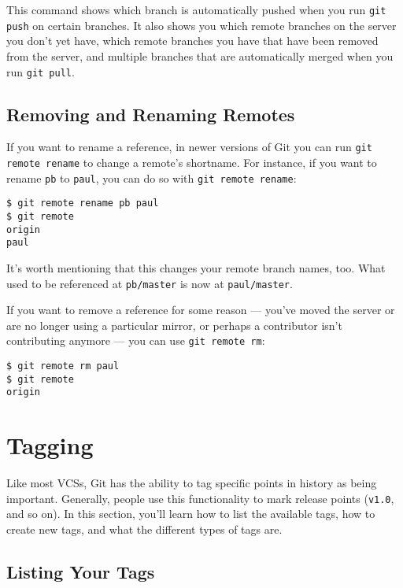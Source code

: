 \documentclass[a4paper]{book}
\begin{document}
This command shows which branch is automatically pushed when you run \texttt{git push} on certain branches. It also shows you which remote branches on the server you don't yet have, which remote branches you have that have been removed from the server, and multiple branches that are automatically merged when you run \texttt{git pull}.

\subsection{Removing and Renaming Remotes}

If you want to rename a reference, in newer versions of Git you can run \texttt{git remote rename} to change a remote's shortname. For instance, if you want to rename \texttt{pb} to \texttt{paul}, you can do so with \texttt{git remote rename}:

\begin{shaded}\begin{verbatim}
$ git remote rename pb paul
$ git remote
origin
paul
\end{verbatim}\end{shaded}

It's worth mentioning that this changes your remote branch names, too. What used to be referenced at \texttt{pb/master} is now at \texttt{paul/master}.

If you want to remove a reference for some reason --- you've moved the server or are no longer using a particular mirror, or perhaps a contributor isn't contributing anymore --- you can use \texttt{git remote rm}:

\begin{shaded}\begin{verbatim}
$ git remote rm paul
$ git remote
origin
\end{verbatim}\end{shaded}

\section{Tagging}

Like most VCSs, Git has the ability to tag specific points in history as being important. Generally, people use this functionality to mark release points (\texttt{v1.0}, and so on). In this section, you'll learn how to list the available tags, how to create new tags, and what the different types of tags are.

\subsection{Listing Your Tags}
\end{document}
